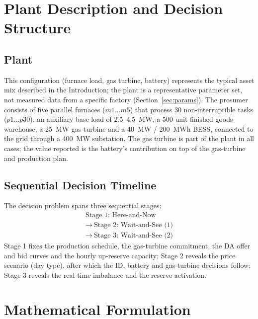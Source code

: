 \documentclass[5p,times,twocolumn]{elsarticle}
\begin{document}
\section{Plant Description and Decision Structure}
\label{sec:plant}

\subsection{Plant}
This configuration (furnace load, gas turbine, battery) represents the typical asset mix described in the Introduction; the plant is a representative parameter set, not measured data from a specific factory (Section~\ref{sec:params}).
The prosumer consists of five parallel furnaces ($m1 \dots m5$) that process 30 non-interruptible tasks ($p1 \dots p30$), an auxiliary base load of 2.5--4.5~MW, a 500-unit finished-goods warehouse, a 25~MW gas turbine and a 40~MW / 200~MWh BESS, connected to the grid through a 400~MW substation.
The gas turbine is part of the plant in all cases; the value reported is the battery’s contribution on top of the gas-turbine and production plan.
\subsection{Sequential Decision Timeline}
The decision problem spans three sequential stages:
\begin{equation}
\begin{gathered}
\text{Stage 1: Here-and-Now}\\
\rightarrow\ \text{Stage 2: Wait-and-See (1)}\\
\rightarrow\ \text{Stage 3: Wait-and-See (2)}
\end{gathered}
\label{eq:decision_stages}
\end{equation}
Stage 1 fixes the production schedule, the gas-turbine commitment, the DA offer and bid curves and the hourly up-reserve capacity; Stage 2 reveals the price scenario (day type), after which the ID, battery and gas-turbine decisions follow; Stage 3 reveals the real-time imbalance and the reserve activation.

\section{Mathematical Formulation}
\label{sec:form}
\end{document}
